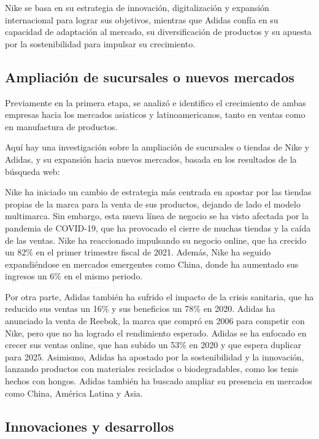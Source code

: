 \documentclass[a4paper,12pt]{article}
\begin{document}
Nike se basa en su estrategia de innovación, digitalización y expansión internacional para lograr sus objetivos, mientras que Adidas confía en su capacidad de adaptación al mercado, su diversificación de productos y su apuesta por la sostenibilidad para impulsar su crecimiento. \par

\subsection{Ampliación de sucursales o nuevos mercados}

Previamente en la primera etapa, se analizó e identifico el crecimiento de ambas empresas hacia los mercados asiaticos y latinoamericanos, tanto en ventas como en manufactura de productos.\par

Aquí hay una investigación sobre la ampliación de sucursales o tiendas de Nike y Adidas, y su expansión hacia nuevos mercados, basada en los resultados de la búsqueda web:\par
Nike ha iniciado un cambio de estrategia más centrada en apostar por las tiendas propias de la marca para la venta de sus productos, dejando de lado el modelo multimarca. Sin embargo, esta nueva línea de negocio se ha visto afectada por la pandemia de COVID-19, que ha provocado el cierre de muchas tiendas y la caída de las ventas. Nike ha reaccionado impulsando su negocio online, que ha crecido un 82\% en el primer trimestre fiscal de 2021. Además, Nike ha seguido expandiéndose en mercados emergentes como China, donde ha aumentado sus ingresos un 6\% en el mismo periodo.\par
Por otra parte, Adidas también ha sufrido el impacto de la crisis sanitaria, que ha reducido sus ventas un 16\% y sus beneficios un 78\% en 2020. Adidas ha anunciado la venta de Reebok, la marca que compró en 2006 para competir con Nike, pero que no ha logrado el rendimiento esperado. Adidas se ha enfocado en crecer sus ventas online, que han subido un 53\% en 2020 y que espera duplicar para 2025. Asimismo, Adidas ha apostado por la sostenibilidad y la innovación, lanzando productos con materiales reciclados o biodegradables, como los tenis hechos con hongos. Adidas también ha buscado ampliar su presencia en mercados como China, América Latina y Asia. \par

\subsection{Innovaciones y desarrollos}
\end{document}
